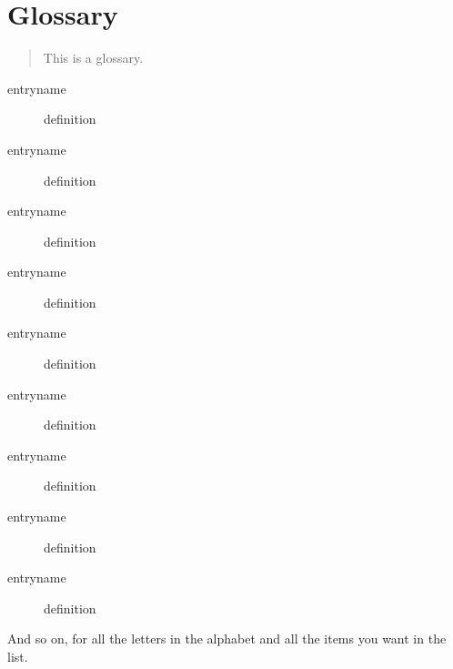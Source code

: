 \section{Glossary}\label{glossary}

\begin{quote}
This is a glossary.
\end{quote}

\begin{description}
\item[entryname]
definition
\item[entryname]
definition
\item[entryname]
definition
\end{description}

\begin{description}
\item[entryname]
definition
\item[entryname]
definition
\item[entryname]
definition
\end{description}

\begin{description}
\item[entryname]
definition
\item[entryname]
definition
\item[entryname]
definition
\end{description}

And so on, for all the letters in the alphabet and all the items you
want in the list.

